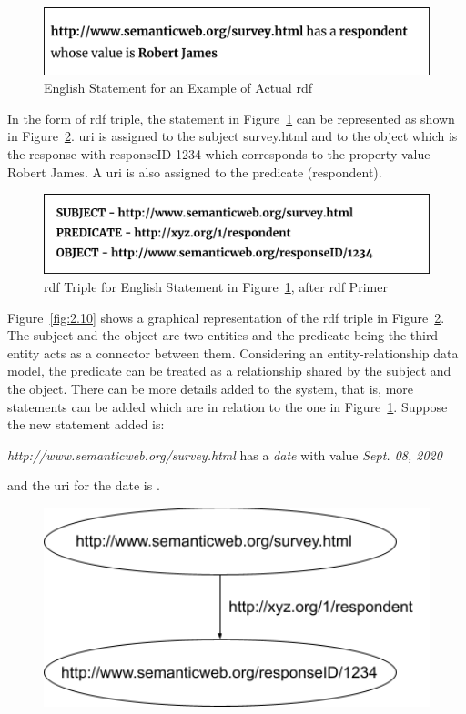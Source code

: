 \begin{doublespace}
\begin{figure}[htp]
    \centering
    \includegraphics[width=15cm]{images/ch2/Figure8.png}
    \caption{English Statement for an Example of Actual \ac{rdf}}
    \label{fig:2.8}
\end{figure}
\par In the form of \ac{rdf} triple, the statement in Figure~\ref{fig:2.8} can be represented as shown in Figure~\ref{fig:2.9}. \ac{uri} is assigned to the subject survey.html and to the object which is the response with responseID 1234 which corresponds to the property value Robert James. A \ac{uri} is also assigned to the predicate (respondent).
\begin{figure}[htp]
    \centering
    \includegraphics[width=15cm]{images/ch2/Figure9.png}
    \caption{\ac{rdf} Triple for English Statement in Figure~\ref{fig:2.8}, after \ac{rdf} Primer~\cite{manola2004rdf}}
    \label{fig:2.9}
\end{figure}
\par Figure~\ref{fig:2.10} shows a graphical representation of the \ac{rdf} triple in Figure~\ref{fig:2.9}. The subject and the object are two entities and the predicate being the third entity acts as a connector between them. Considering an entity-relationship data model, the predicate can be treated as a relationship shared by the subject and the object. There can be more details added to the system, that is, more statements can be added which are in relation to the one in Figure~\ref{fig:2.8}. Suppose the new statement added is:
\begin{center}
\par \emph{http://www.semanticweb.org/survey.html} has a \emph{date} with value \emph{Sept. 08, 2020}    
\end{center} and the \ac{uri} for the date is .
\begin{figure}[htp]
    \centering
    \includegraphics[width=14cm]{images/ch2/Figure10.png}

\end{figure}
\end{doublespace}
